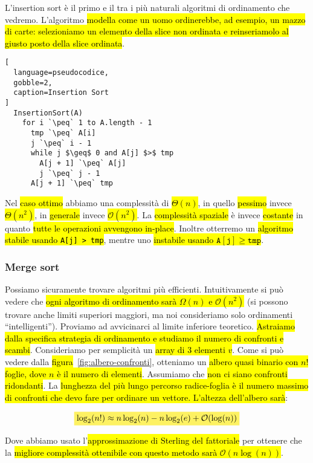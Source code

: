 \documentclass[a4paper,11pt,twoside]{article}
\theoremstyle{plain}
\theoremstyle{definition}
\theoremstyle{remark}
\newcommand{\mhl}[1]{\colorbox{hlcolor}{$\displaystyle #1$}}
\newcommand{\peq}{$\gets$}
\begin{document}
L'insertion sort è il primo e il tra i più naturali algoritmi di ordinamento che
vedremo. L'algoritmo \hl{modella come un uomo ordinerebbe, ad esempio, un mazzo
di carte: selezioniamo un elemento della slice non ordinata e reinseriamolo al
giusto posto della slice ordinata}.

\begin{lstlisting}[
  language=pseudocodice,
  gobble=2,
  caption=Insertion Sort
]
  InsertionSort(A)
    for i `\peq` 1 to A.length - 1
      tmp `\peq` A[i]
      j `\peq` i - 1
      while j $\geq$ 0 and A[j] $>$ tmp
        A[j + 1] `\peq` A[j]
        j `\peq` j - 1
      A[j + 1] `\peq` tmp
\end{lstlisting}

Nel \hl{caso ottimo} abbiamo una complessità di \hl{$\Theta(n)$}, in quello
\hl{pessimo} invece \hl{$\Theta(n^2)$}, in \hl{generale} invece
\hl{$\mathcal{O}(n^2)$}. La \hl{complessità spaziale} è invece \hl{costante} in
quanto \hl{tutte le operazioni avvengono in-place}. Inoltre otterremo un
\hl{algoritmo stabile usando \texttt{A[j] > tmp}}, mentre uno \hl{instabile
usando $\mathtt{A[j]} \geq \mathtt{tmp}$}.

\subsubsection{Merge sort}\label{sec:merge-sort}

Possiamo sicuramente trovare algoritmi più efficienti. Intuitivamente si può
vedere che \hl{ogni algoritmo di ordinamento sarà $\Omega(n)$ e
$\mathcal{O}(n^2)$} (si possono trovare anche limiti superiori maggiori, ma noi
consideriamo solo ordinamenti ``intelligenti''). Proviamo ad avvicinarci al
limite inferiore teoretico. \hl{Astraiamo dalla specifica strategia di
ordinamento e studiamo il numero di confronti e scambi}. Consideriamo per
semplicità un \hl{array di $3$ elementi $v$}. Come si può vedere dalla
\hl{figura}~\ref{fig:albero-confronti}, otteniamo un \hl{albero quasi binario
con $n!$ foglie, dove $n$ è il numero di elementi}. Assumiamo che \hl{non ci
siano confronti ridondanti}. La \hl{lunghezza del più lungo percorso
radice-foglia è il numero massimo di confronti che devo fare per ordinare un
vettore. L'altezza dell'albero sarà}:

\begin{equation}
  \mhl{
    \log_2(n!) \approx n\log_2(n) - n\log_2(e) + \mathcal{O}(\log(n))
  }
\end{equation}

Dove abbiamo usato l'\hl{approssimazione di Sterling del fattoriale} per
ottenere che la \hl{migliore complessità ottenibile con questo metodo sarà
$\mathcal{O}(n\log(n))$}.
\end{document}
